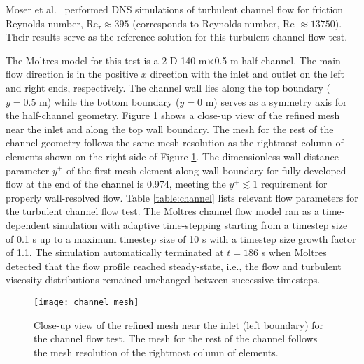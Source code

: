 Moser et al.\ \cite{moser_direct_1999} performed \gls{DNS} simulations of turbulent channel flow
for friction Reynolds number, Re$_\tau\approx395$ (corresponds to Reynolds number, Re
$\approx 13750$). Their results serve as the reference solution for this turbulent channel flow
test.

The Moltres model for this test is a 2-D 140 m$\times$0.5 m half-channel. The main flow direction
is in the positive $x$ direction with the inlet and outlet on the left and right ends,
respectively. The channel wall lies along the top boundary ($y=0.5$ m) while the bottom boundary
($y=0$ m) serves as a symmetry axis for the half-channel geometry. Figure \ref{fig:channel-mesh}
shows a close-up view of the refined mesh near the inlet and along the top wall boundary. The mesh
for the rest of the channel geometry follows the same mesh resolution as the rightmost column of
elements shown on the right side of Figure \ref{fig:channel-mesh}. The dimensionless wall distance
parameter $y^+$ of the first mesh element along wall boundary for fully developed flow at the end
of the channel is 0.974, meeting the
$y^+ \lesssim 1$ requirement for properly wall-resolved flow. Table \ref{table:channel} lists
relevant flow parameters for the turbulent channel flow test. The Moltres channel flow model
ran as a time-dependent simulation with adaptive time-stepping starting from a timestep size of 0.1
s up to a maximum timestep size of 10 s with a timestep size growth factor of 1.1. The simulation
automatically terminated at $t=186$ s when Moltres detected that the flow profile reached
steady-state, i.e., the flow and turbulent viscosity distributions remained unchanged between
successive timesteps.

\begin{figure}[htb!]
  \centering
  \texttt{[image: channel\_mesh]}
  \caption{Close-up view of the refined mesh near the inlet (left boundary) for the channel flow
    test. The mesh for the rest of the channel follows the mesh resolution of the rightmost column
  of elements.}
  \label{fig:channel-mesh}
\end{figure}

